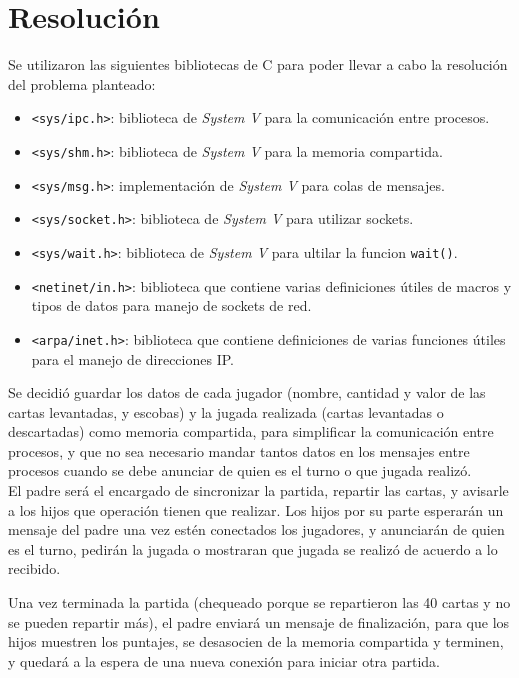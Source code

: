 \section{Resolución}

Se utilizaron las siguientes bibliotecas de C para poder llevar a cabo la resolución del problema planteado:\\

\begin{itemize}
    \item \texttt{<sys/ipc.h>}: biblioteca de \textit{System V} para la comunicación entre procesos.
    \item \texttt{<sys/shm.h>}: biblioteca de \textit{System V} para la memoria compartida.
    \item \texttt{<sys/msg.h>}: implementación de \textit{System V} para colas de mensajes.
    \item \texttt{<sys/socket.h>}: biblioteca de \textit{System V} para utilizar sockets.
    \item \texttt{<sys/wait.h>}: biblioteca de \textit{System V} para ultilar la funcion \texttt{wait()}.
    \item \texttt{<netinet/in.h>}: biblioteca que contiene varias definiciones útiles de macros y tipos de datos para manejo de sockets de red.
    \item \texttt{<arpa/inet.h>}: biblioteca que contiene definiciones de varias funciones útiles para el manejo de direcciones IP.\\
    
\end{itemize}

Se decidió guardar los datos de cada jugador (nombre, cantidad y valor de las cartas levantadas, y escobas) y la jugada realizada (cartas levantadas o descartadas) como memoria compartida, para simplificar la comunicación entre procesos, y que no sea necesario mandar tantos datos en los mensajes entre procesos cuando se debe anunciar de quien es el turno o que jugada realizó.\\

El padre será el encargado de sincronizar la partida, repartir las cartas, y avisarle a los hijos que operación tienen que realizar. Los hijos por su parte esperarán un mensaje del padre una vez estén conectados los jugadores, y anunciarán de quien es el turno, pedirán la jugada o mostraran que jugada se realizó de acuerdo a lo recibido.

Una vez terminada la partida (chequeado porque se repartieron las 40 cartas y no se pueden repartir más), el padre enviará un mensaje de finalización, para que los hijos muestren los puntajes, se desasocien de la memoria compartida y terminen, y quedará a la espera de una nueva conexión para iniciar otra partida.

